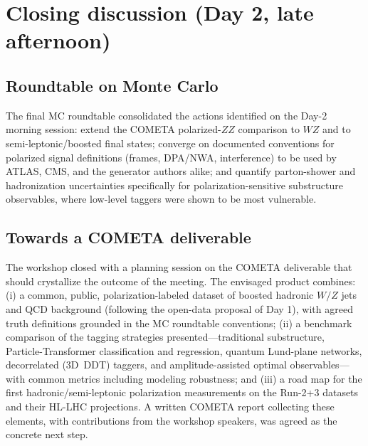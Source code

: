 \section{Closing discussion (Day 2, late afternoon)}

\subsection{Roundtable on Monte Carlo}
The final MC roundtable consolidated the actions identified on the Day-2
morning session: extend the COMETA polarized-$ZZ$ comparison to $WZ$ and to
semi-leptonic/boosted final states; converge on documented conventions for
polarized signal definitions (frames, DPA/NWA, interference) to be used by
ATLAS, CMS, and the generator authors alike; and quantify parton-shower and
hadronization uncertainties specifically for polarization-sensitive
substructure observables, where low-level taggers were shown to be most
vulnerable.

\subsection{Towards a COMETA deliverable}
The workshop closed with a planning session on the COMETA deliverable that
should crystallize the outcome of the meeting. The envisaged product combines:
(i) a common, public, polarization-labeled dataset of boosted hadronic
$W/Z$ jets and QCD background (following the open-data proposal of Day 1),
with agreed truth definitions grounded in the MC roundtable conventions;
(ii) a benchmark comparison of the tagging strategies presented---traditional
substructure, Particle-Transformer classification and regression, quantum
Lund-plane networks, decorrelated (3D~DDT) taggers, and amplitude-assisted
optimal observables---with common metrics including modeling robustness; and
(iii) a road map for the first hadronic/semi-leptonic polarization
measurements on the Run-2+3 datasets and their HL-LHC projections. A written
COMETA report collecting these elements, with contributions from the workshop
speakers, was agreed as the concrete next step.
